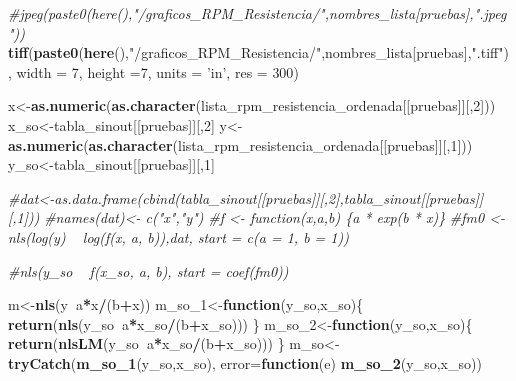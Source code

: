 \documentclass[]{article}
\newenvironment{Shaded}{\begin{snugshade}}{\end{snugshade}}
\newcommand{\KeywordTok}[1]{\textcolor[rgb]{0.13,0.29,0.53}{\textbf{#1}}}
\newcommand{\DataTypeTok}[1]{\textcolor[rgb]{0.13,0.29,0.53}{#1}}
\newcommand{\DecValTok}[1]{\textcolor[rgb]{0.00,0.00,0.81}{#1}}
\newcommand{\StringTok}[1]{\textcolor[rgb]{0.31,0.60,0.02}{#1}}
\newcommand{\CommentTok}[1]{\textcolor[rgb]{0.56,0.35,0.01}{\textit{#1}}}
\newcommand{\ControlFlowTok}[1]{\textcolor[rgb]{0.13,0.29,0.53}{\textbf{#1}}}
\newcommand{\OperatorTok}[1]{\textcolor[rgb]{0.81,0.36,0.00}{\textbf{#1}}}
\newcommand{\NormalTok}[1]{#1}
\begin{document}
\begin{Shaded}
\begin{Highlighting}[]
{{{{{{{{{{{{    \CommentTok{#jpeg(paste0(here(),"/graficos_RPM_Resistencia/",nombres_lista[pruebas],".jpeg"))}
    \KeywordTok{tiff}\NormalTok{(}\KeywordTok{paste0}\NormalTok{(}\KeywordTok{here}\NormalTok{(),}\StringTok{"/graficos_RPM_Resistencia/"}\NormalTok{,nombres_lista[pruebas],}\StringTok{".tiff"}\NormalTok{), }\DataTypeTok{width =} \DecValTok{7}\NormalTok{, }\DataTypeTok{height =}\DecValTok{7}\NormalTok{, }\DataTypeTok{units =} \StringTok{'in'}\NormalTok{, }\DataTypeTok{res =} \DecValTok{300}\NormalTok{)}
    
    
    
\NormalTok{    x<-}\KeywordTok{as.numeric}\NormalTok{(}\KeywordTok{as.character}\NormalTok{(lista_rpm_resistencia_ordenada[[pruebas]][,}\DecValTok{2}\NormalTok{]))}
\NormalTok{    x_so<-tabla_sinout[[pruebas]][,}\DecValTok{2}\NormalTok{]}
\NormalTok{    y<-}\StringTok{ }\KeywordTok{as.numeric}\NormalTok{(}\KeywordTok{as.character}\NormalTok{(lista_rpm_resistencia_ordenada[[pruebas]][,}\DecValTok{1}\NormalTok{]))}
\NormalTok{    y_so<-tabla_sinout[[pruebas]][,}\DecValTok{1}\NormalTok{]}
    
    \CommentTok{#dat<-as.data.frame(cbind(tabla_sinout[[pruebas]][,2],tabla_sinout[[pruebas]][,1]))}
    \CommentTok{#names(dat)<- c("x","y")}
    \CommentTok{#f <- function(x,a,b) \{a * exp(b * x)\}}
    \CommentTok{#fm0 <- nls(log(y) ~ log(f(x, a, b)),dat, start = c(a = 1, b = 1))}
    
    \CommentTok{#nls(y_so ~ f(x_so, a, b), start = coef(fm0))}
    
    
\NormalTok{    m<-}\KeywordTok{nls}\NormalTok{(y}\OperatorTok{~}\NormalTok{a}\OperatorTok{*}\NormalTok{x}\OperatorTok{/}\NormalTok{(b}\OperatorTok{+}\NormalTok{x))}
\NormalTok{    m_so_}\DecValTok{1}\NormalTok{<-}\ControlFlowTok{function}\NormalTok{(y_so,x_so)\{}
      \KeywordTok{return}\NormalTok{(}\KeywordTok{nls}\NormalTok{(y_so}\OperatorTok{~}\NormalTok{a}\OperatorTok{*}\NormalTok{x_so}\OperatorTok{/}\NormalTok{(b}\OperatorTok{+}\NormalTok{x_so)))}
\NormalTok{    \}}
\NormalTok{    m_so_}\DecValTok{2}\NormalTok{<-}\ControlFlowTok{function}\NormalTok{(y_so,x_so)\{}
      \KeywordTok{return}\NormalTok{(}\KeywordTok{nlsLM}\NormalTok{(y_so}\OperatorTok{~}\NormalTok{a}\OperatorTok{*}\NormalTok{x_so}\OperatorTok{/}\NormalTok{(b}\OperatorTok{+}\NormalTok{x_so)))}
\NormalTok{    \}}
\NormalTok{    m_so<-}\KeywordTok{tryCatch}\NormalTok{(}\KeywordTok{m_so_1}\NormalTok{(y_so,x_so), }\DataTypeTok{error=}\ControlFlowTok{function}\NormalTok{(e) }\KeywordTok{m_so_2}\NormalTok{(y_so,x_so))}
    
}}}}}}}}}}}}
\end{Highlighting}
\end{Shaded}
\end{document}

